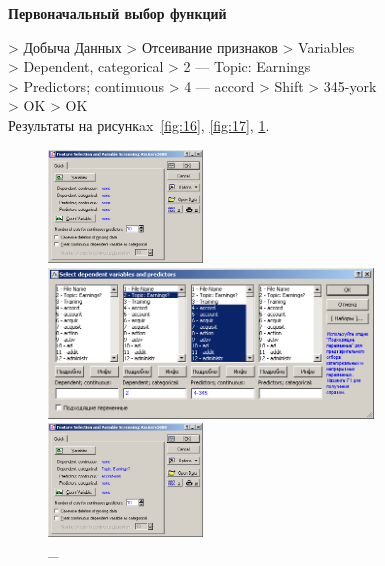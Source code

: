 \newpage

\begin{center}
  \textbf{Первоначальный выбор функций}
\end{center}

> Добыча Данных > Отсеивание признаков > Variables \\
> Dependent, categorical > 2 — Topic: Earnings \\
> Predictors; contimuous > 4 — accord > Shift > 345-york \\
> OK > OK \\

Результаты на рисункax~\ref{fig:16}, \ref{fig:17}, \ref{fig:18}.

\begin{figure}[!h]
  \centering

  \begin{minipage}{0.22\textwidth}
    \centering

    \includegraphics[height=3cm]
    {inc/16.PNG}

    \caption{\_}

    \label{fig:16}
  \end{minipage}
  \begin{minipage}{0.52\textwidth}
    \centering

    \includegraphics[height=4cm]
    {inc/17.PNG}

    \caption{\_}

    \label{fig:17}
  \end{minipage}
  \begin{minipage}{0.22\textwidth}
    \centering

    \includegraphics[height=3cm]
    {inc/18.PNG}

    \caption{\_}

    \label{fig:18}
  \end{minipage}
\end{figure}

